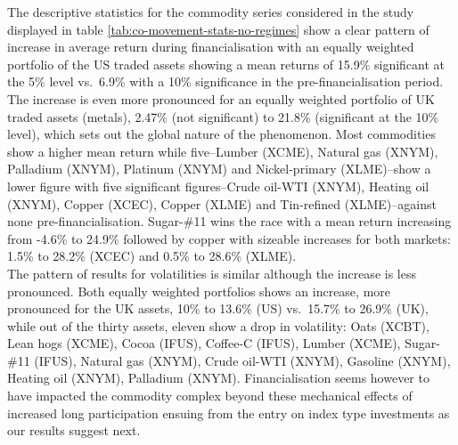 \documentclass[]{elsarticle} %
\begin{document}
The descriptive statistics for the commodity series considered in the study displayed in table \ref{tab:co-movement-stats-no-regimes} show a clear pattern of increase in average return during financialisation with an equally weighted portfolio of the US traded assets showing a mean returns of 15.9\% significant at the 5\% level vs.~6.9\% with a 10\% significance in the pre-financialisation period. The increase is even more pronounced for an equally weighted portfolio of UK traded assets (metals), 2.47\% (not significant) to 21.8\% (significant at the 10\% level), which sets out the global nature of the phenomenon. Most commodities show a higher mean return while five--Lumber (XCME), Natural gas (XNYM), Palladium (XNYM), Platinum (XNYM) and Nickel-primary (XLME)--show a lower figure with five significant figures--Crude oil-WTI (XNYM), Heating oil (XNYM), Copper (XCEC), Copper (XLME) and Tin-refined (XLME)--against none pre-financialisation. Sugar-\#11 wins the race with a mean return increasing from -4.6\% to 24.9\% followed by copper with sizeable increases for both markets: 1.5\% to 28.2\% (XCEC) and 0.5\% to 28.6\% (XLME).\\
The pattern of results for volatilities is similar although the increase is less pronounced. Both equally weighted portfolios shows an increase, more pronounced for the UK assets, 10\% to 13.6\% (US) vs.~15.7\% to 26.9\% (UK), while out of the thirty assets, eleven show a drop in volatility: Oats (XCBT), Lean hogs (XCME), Cocoa (IFUS), Coffee-C (IFUS), Lumber (XCME), Sugar-\#11 (IFUS), Natural gas (XNYM), Crude oil-WTI (XNYM), Gasoline (XNYM), Heating oil (XNYM), Palladium (XNYM). Financialisation seems however to have impacted the commodity complex beyond these mechanical effects of increased long participation ensuing from the entry on index type investments as our results suggest next.

\medskip\setlength{\parindent}{0pt}
\end{document}
